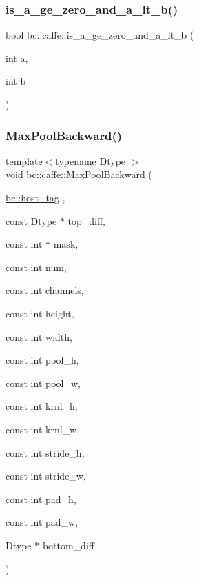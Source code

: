 \subsubsection{\texorpdfstring{is\+\_\+a\+\_\+ge\+\_\+zero\+\_\+and\+\_\+a\+\_\+lt\+\_\+b()}{is\_a\_ge\_zero\_and\_a\_lt\_b()}}
{\footnotesize\ttfamily bool bc\+::caffe\+::is\+\_\+a\+\_\+ge\+\_\+zero\+\_\+and\+\_\+a\+\_\+lt\+\_\+b (\begin{DoxyParamCaption}\item[{int}]{a,  }\item[{int}]{b }\end{DoxyParamCaption})\hspace{0.3cm}{\ttfamily [inline]}}

\mbox{\label{namespacebc_1_1caffe_a58b8b5cb4f1834cbf79a204f50776890}} 
\subsubsection{\texorpdfstring{Max\+Pool\+Backward()}{MaxPoolBackward()}}
{\footnotesize\ttfamily template$<$typename Dtype $>$ \\
void bc\+::caffe\+::\+Max\+Pool\+Backward (\begin{DoxyParamCaption}\item[{\hyperlink{structbc_1_1host__tag}{bc\+::host\+\_\+tag}}]{,  }\item[{const Dtype $\ast$}]{top\+\_\+diff,  }\item[{const int $\ast$}]{mask,  }\item[{const int}]{num,  }\item[{const int}]{channels,  }\item[{const int}]{height,  }\item[{const int}]{width,  }\item[{const int}]{pool\+\_\+h,  }\item[{const int}]{pool\+\_\+w,  }\item[{const int}]{krnl\+\_\+h,  }\item[{const int}]{krnl\+\_\+w,  }\item[{const int}]{stride\+\_\+h,  }\item[{const int}]{stride\+\_\+w,  }\item[{const int}]{pad\+\_\+h,  }\item[{const int}]{pad\+\_\+w,  }\item[{Dtype $\ast$}]{bottom\+\_\+diff }\end{DoxyParamCaption})}

